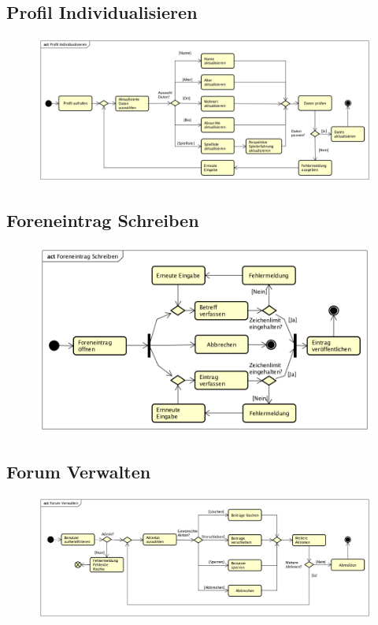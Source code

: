 \vfill

\subsection*{Profil Individualisieren}

\begin{figure}[h]
	\centering
	\includegraphics[width=0.8\linewidth]{docs/3_Aktivitaetsdiagramme/Patrick/Profil_Individualisieren.png}
	\label{fig:ActDia_Profil_Individualisieren}
\end{figure}

\vfill

\subsection*{Foreneintrag Schreiben}
\begin{figure}[h]
	\centering
	\includegraphics[width=0.8\linewidth]{docs/3_Aktivitaetsdiagramme/Patrick/Foreneintrag_Schreiben.png}
	\label{fig:ActDia_Foreneinntrag_Schreiben}
\end{figure}
\vfill

\pagebreak

\vfill

\subsection*{Forum Verwalten}
\begin{figure}[h]
	\centering
	\includegraphics[width=0.8\linewidth]{docs/3_Aktivitaetsdiagramme/Patrick/Forum_Verwalten.png}
	\label{fig:ActDia_Forum_Verwalten}
\end{figure}

